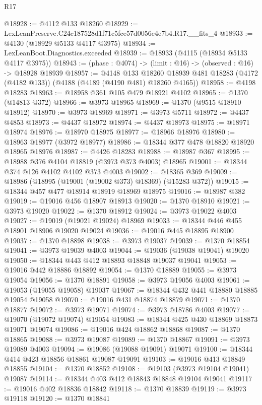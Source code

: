 \begin{lexlean}{R17}
\begin{coremodule}
@18928 := @4112 @133 @18260
@18929 := LexLeanPreserve.C24c187528d1f71c5fce57d0056e4e7b4.R17.__fits_4
@18933 := @4130 (@18929 @5133 @4117 @3975)
@18934 := LexLeanBoot.Diagnostics.exceeded
@18939 := @18933 (@4115 (@18934 @5133 @4117 @3975))
@18943 := (phase : @4074) -> (limit : @16) -> (observed : @16) -> @18928 @18939
@18957 := @4148
    @133
    @18260
    @18939
    @481
    @18283
    (@4172 (@4182 @133))
    (@4188 (@4189 (@4190 @481) @18260 @4165))
@18958 := @4198 @18283
@18963 := @18958 @361 @105 @479 @18921 @4102
@18965 := @1370 (@14813 @372)
@18966 := @3973 @18965
@18969 := @1370 (@9515 @18910 @18912)
@18970 := @3973 @18969
@18971 := @3973 @5711
@18972 := @4437 @4853
@18973 := @4437 @18972
@18974 := @4437 @18973
@18975 := @18971 @18974
@18976 := @18970 @18975
@18977 := @18966 @18976
@18980 := @18963 @18977 (@3972 @18977)
@18986 := @18344 @377 @478 @18820 @18920 @18965 @18976
@18987 := @4426 @18283
@18988 := @18987 @367
@18995 := @18988 @376 @4104 @18819 (@3973 @373 @4003) @18965
@19001 := @18344 @374 @126 @4102 @4102 @373 @4003
@19002 := @18365 @369
@19009 := @18986 (@18995 (@19001 (@19002 @373) @18369) (@15283 @372))
@19015 := @18344 @457 @477 @18914 @18919 @18969 @18975
@19016 := @18987 @382
@19019 := @19016 @456 @18907 @18913
@19020 := @1370 @18910
@19021 := @3973 @19020
@19022 := @1370 @18912
@19024 := @3973 @19022 @4003
@19027 := @19019 (@19021 @19024) @18969
@19033 := @18344 @446 @455 @18901 @18906 @19020 @19024
@19036 := @19016 @445 @18895 @18900
@19037 := @1370 @18898
@19038 := @3973 @19037
@19039 := @1370 @18854
@19041 := @3973 @19039 @4003
@19044 := @19036 (@19038 @19041) @19020
@19050 := @18344 @443 @412 @18893 @18848 @19037 @19041
@19053 := @19016 @442 @18886 @18892
@19054 := @1370 @18889
@19055 := @3973 @19054
@19056 := @1370 @18891
@19058 := @3973 @19056 @4003
@19061 := @19053 (@19055 @19058) @19037
@19067 := @18344 @432 @441 @18880 @18885 @19054 @19058
@19070 := @19016 @431 @18874 @18879
@19071 := @1370 @18877
@19072 := @3973 @19071
@19074 := @3973 @18786 @4003
@19077 := @19070 (@19072 @19074) @19054
@19083 := @18344 @425 @430 @18869 @18873 @19071 @19074
@19086 := @19016 @424 @18862 @18868
@19087 := @1370 @18865
@19088 := @3973 @19087
@19089 := @1370 @18867
@19091 := @3973 @19089 @4003
@19094 := @19086 (@19088 @19091) @19071
@19100 := @18344 @414 @423 @18856 @18861 @19087 @19091
@19103 := @19016 @413 @18849 @18855
@19104 := @1370 @18852
@19108 := @19103 (@3973 @19104 @19041) @19087
@19114 := @18344 @403 @412 @18843 @18848 @19104 @19041
@19117 := @19016 @402 @18836 @18842
@19118 := @1370 @18839
@19119 := @3973 @19118
@19120 := @1370 @18841

\end{coremodule}
\end{lexlean}
